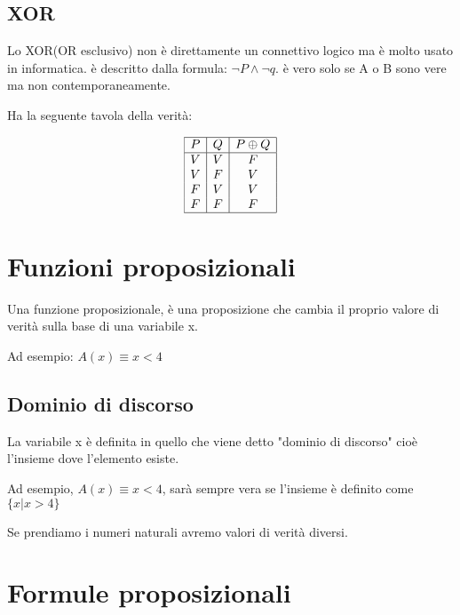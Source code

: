 \documentclass{article}
\begin{document}
\subsection{XOR}

Lo XOR(OR esclusivo) non è direttamente un connettivo logico ma è molto usato in informatica. è descritto dalla formula: $ \neg P \land \neg q $. è vero solo se A o B sono vere ma non contemporaneamente.

Ha la seguente tavola della verità:

\[
\begin{array}{|c|c|c|}
	\hline
	P & Q & P \oplus Q \\
	\hline
	V & V & F \\
	V & F & V \\
	F & V & V \\
	F & F & F \\
	\hline
\end{array}
\]



\section{Funzioni proposizionali}

Una funzione proposizionale, è una proposizione che cambia il proprio valore di verità sulla base di una variabile x.

Ad esempio: $A(x) \equiv x < 4 $

\subsection{Dominio di discorso}

La variabile x è definita in quello che viene detto "dominio di discorso" cioè l'insieme dove l'elemento esiste.

Ad esempio, $A(x) \equiv x < 4 $, sarà sempre vera se l'insieme è definito come $ \{x | x > 4\} $

Se prendiamo i numeri naturali avremo valori di verità diversi.

\section{Formule proposizionali}
\end{document}
